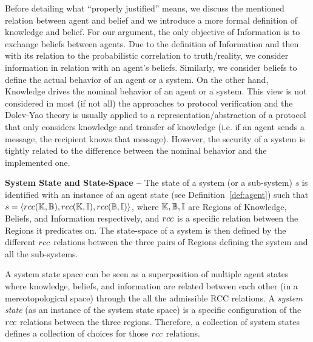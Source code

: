 Before detailing what ``properly justified'' means, we discuss the mentioned
relation between agent and belief and we introduce a more formal definition
of knowledge and belief. For our argument, the only objective of
Information is to exchange beliefs between agents.
Due to the definition of Information and then with its relation to the probabilistic
correlation to truth/reality, we consider
information in relation with an agent's beliefs. Similarly, we consider
beliefs to define the actual behavior of an agent or a system. On the other hand,
Knowledge drives the nominal behavior of an agent or a system. This view
is not considered in most (if not all) the approaches to protocol verification
and the Dolev-Yao theory is usually applied to a representation/abstraction
of a protocol that only considers knowledge and transfer of knowledge (i.e.
if an agent sends a message, the recipient knows that message). However,
the security of a system is tightly related to the difference between
the nominal behavior and the implemented one.

\begin{definition}{\bf System State and State-Space --}\label{def:system}
	The state of a system (or a sub-system) $s$ is identified with an
	instance of an agent state (see Definition~\ref{def:agent}) such that
	$s=\langle rcc(\mathbb{K},\mathbb{B}),rcc(\mathbb{K},\mathbb{I}),rcc(\mathbb{B},\mathbb{I})\rangle$,
	where $\mathbb{K},\mathbb{B},\mathbb{I}$ are Regions
	of Knowledge, Beliefs, and Information respectively, and $rcc$ is a
	specific relation between the Regions it predicates on.  The
	state-space of a system is then defined by the different $rcc$
	relations between the three pairs of Regions defining the system and
	all the sub-systems.
\end{definition}
A system state space can be seen as a superposition of multiple agent states where knowledge,
beliefs, and information are related between each other (in a mereotopological
space) through the all the admissible RCC relations. 
A \emph{system state} (as an instance of the system state space)
is a specific configuration of
the $rcc$ relations between the three regions. Therefore, a collection of 
system states defines a collection of choices for those $rcc$ relations.


